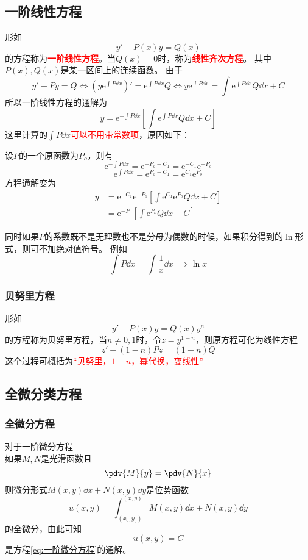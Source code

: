 \subsection{一阶线性方程}
形如\[ y' + P(x)y = Q(x) \]的方程称为\textcolor{red}{\textbf{\textsf{一阶线性方程}}}。当$Q(x)=0$时，称为\textcolor{red}{\textbf{\textsf{线性齐次方程}}}。
其中$P(x),Q(x)$是某一区间上的连续函数。
由于
\[ y' + Py = Q \iff (y\mathrm{e}^{\int P\dd{x}})' = \mathrm{e}^{\int P\dd{x}}Q \iff y\mathrm{e}^{\int P\dd{x}} = \int \mathrm{e}^{\int P\dd{x}}Q\dd{x} + C \]
所以一阶线性方程的通解为
\[ y = \mathrm{e}^{-\int P\dd{x}}\left[\int \mathrm{e}^{\int P\dd{x}}Q \dd{x} +C \right] \]
这里计算的$\int P\dd{x}$\textcolor{red}{可以不用带常数项}，原因如下：

设$P$的一个原函数为$P_o$，则有
\[ \mathrm{e}^{-\int P\dd{x}} = \mathrm{e}^{-P_o - C_1} = \mathrm{e}^{-C_1}\mathrm{e}^{-P_o} \]
\[ \mathrm{e}^{\int P\dd{x}} = \mathrm{e}^{P_o + C_1} = \mathrm{e}^{C_1}\mathrm{e}^{P_o} \]
方程通解变为
\begin{align*}
    y & = \mathrm{e}^{-C_1}\mathrm{e}^{-P_o}\left[\int \mathrm{e}^{C_1}\mathrm{e}^{P_o} Q \dd{x} +C \right] \\
      & = \mathrm{e}^{-P_o}\left[\int \mathrm{e}^{P_o} Q \dd{x} +C \right]
\end{align*}

同时如果$P$的系数既不是无理数也不是分母为偶数的时候，如果积分得到的$\ln$形式，则可不加绝对值符号。
例如
\[ \int P\dd{x} =  \int \frac{1}{x}\dd{x} \implies \ln x \]

\subsubsection{贝努里方程}
形如
\[ y' + P(x)y = Q(x)y^n \]
的方程称为贝努里方程，当$n\neq 0,1$时，令$z=y^{1-n}$，则原方程可化为线性方程
\[ z' + (1-n)Pz = (1-n)Q \]
这个过程可概括为\textcolor{red}{“贝努里，$1-n$，幂代换，变线性”}

\subsection{全微分类方程}
\subsubsection{全微分方程}
对于一阶微分方程
\begin{equation}
    \label{eq:一阶微分方程}
\end{equation}
如果$M,N$是光滑函数且
\[ \pdv{M}{y} = \pdv{N}{x} \]
则微分形式$M(x,y)\dd{x} + N(x,y)\dd{y}$是位势函数
\[ u(x,y) = \int_{(x_0,y_0)}^{(x,y)} M(x,y)\dd{x} + N(x,y)\dd{y} \]
的全微分，由此可知
\[ u(x,y) = C \]
是方程\ref{eq:一阶微分方程}的通解。

